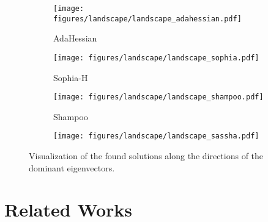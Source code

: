 
\begin{figure*}[t!]
    \centering
        \begin{subfigure}[b]{0.245\textwidth}
            \centering
            \texttt{[image: figures/landscape/landscape\_adahessian.pdf]}
            \caption{AdaHessian}
        \end{subfigure}
        \begin{subfigure}[b]{0.245\textwidth}
            \centering
            \texttt{[image: figures/landscape/landscape\_sophia.pdf]}
            \caption{Sophia-H}
        \end{subfigure}
     \begin{subfigure}[b]{0.245\textwidth}
        \centering
        \texttt{[image: figures/landscape/landscape\_shampoo.pdf]}
        \caption{Shampoo}
     \end{subfigure}
    \begin{subfigure}[b]{0.245\textwidth}
        \centering
        \texttt{[image: figures/landscape/landscape\_sassha.pdf]}
        \caption{\sassha}
    \end{subfigure}
    \caption{Visualization of the found solutions along the directions of the dominant eigenvectors.}
    \label{fig:landscape}
\end{figure*}

\section{Related Works} \label{sec:related_works}
